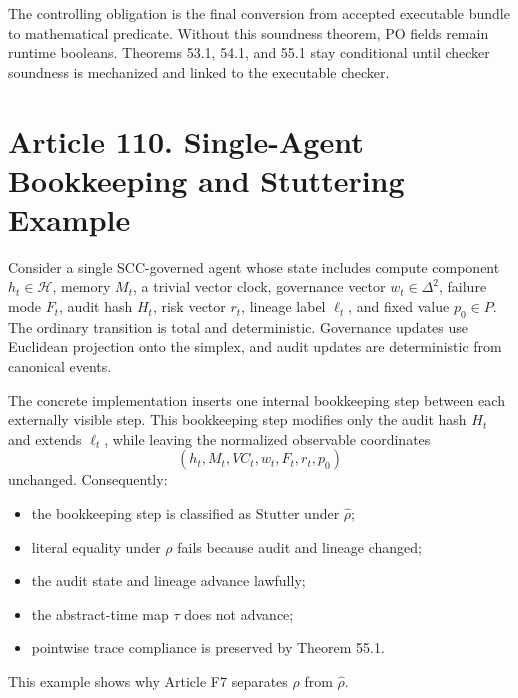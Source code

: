 \documentclass[10pt,oneside]{article}
\theoremstyle{definition}
\theoremstyle{remark}
\newcommand{\Stutter}{\mathrm{Stutter}}
\begin{document}
The controlling obligation is the final conversion from accepted executable bundle to mathematical predicate. Without this soundness theorem, PO fields remain runtime booleans. Theorems 53.1, 54.1, and 55.1 stay conditional until checker soundness is mechanized and linked to the executable checker.

\section{Article 110. Single-Agent Bookkeeping and Stuttering Example}
Consider a single SCC-governed agent whose state includes compute component \(h_t\in\mathcal{H}\), memory \(M_t\), a trivial vector clock, governance vector \(w_t\in\Delta^2\), failure mode \(F_t\), audit hash \(H_t\), risk vector \(r_t\), lineage label \(\ell_t\), and fixed value \(p_0\in P\). The ordinary transition is total and deterministic. Governance updates use Euclidean projection onto the simplex, and audit updates are deterministic from canonical events.

The concrete implementation inserts one internal bookkeeping step between each externally visible step. This bookkeeping step modifies only the audit hash \(H_t\) and extends \(\ell_t\), while leaving the normalized observable coordinates
\[
(h_t,M_t,VC_t,w_t,F_t,r_t,p_0)
\]
unchanged. Consequently:
\begin{itemize}
  \item the bookkeeping step is classified as \(\Stutter\) under \(\widehat{\rho}\);
  \item literal equality under \(\rho\) fails because audit and lineage changed;
  \item the audit state and lineage advance lawfully;
  \item the abstract-time map \(\tau\) does not advance;
  \item pointwise trace compliance is preserved by Theorem 55.1.
\end{itemize}
This example shows why Article F7 separates \(\rho\) from \(\widehat{\rho}\).
\end{document}
